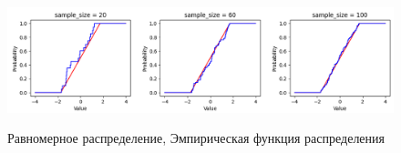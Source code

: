 \begin{figure}[H]
	\centering
	{\includegraphics[scale=0.6]{part_edf/figures/uniform}}
		\caption{Равномерное распределение, Эмпирическая функция распределения}
		\label{fig:edf_uniform}
	\end{figure}
